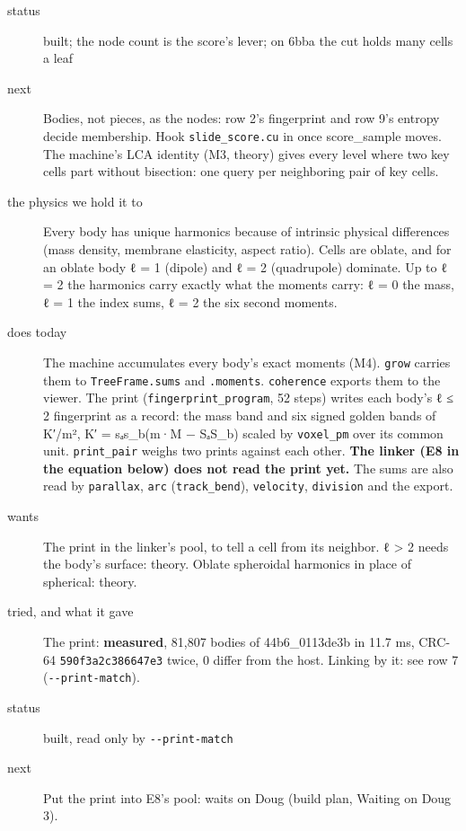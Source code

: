 \begin{description}
\item[{status}] built; the node count is the score's lever; on 6bba the cut holds many cells a leaf
\item[{next}] Bodies, not pieces, as the nodes: row 2's fingerprint and row 9's entropy decide membership. Hook \texttt{slide\_\allowbreak{}score.\allowbreak{}cu} in once score\_\allowbreak{}sample moves. The machine's LCA identity (M3, theory) gives every level where two key cells part without bisection: one query per neighboring pair of key cells.
\end{description}

\begin{description}
\item[{the physics we hold it to}] Every body has unique harmonics because of intrinsic physical differences (mass density, membrane elasticity, aspect ratio). Cells are oblate, and for an oblate body ℓ = 1 (dipole) and ℓ = 2 (quadrupole) dominate. Up to ℓ = 2 the harmonics carry exactly what the moments carry: ℓ = 0 the mass, ℓ = 1 the index sums, ℓ = 2 the six second moments.
\item[{does today}] The machine accumulates every body's exact moments (M4). \texttt{grow} carries them to \texttt{Tree\allowbreak{}Frame.\allowbreak{}sums} and \texttt{.\allowbreak{}moments}. \texttt{coherence} exports them to the viewer. The print (\texttt{fingerprint\_\allowbreak{}program}, 52 steps) writes each body's ℓ ≤ 2 fingerprint as a record: the mass band and six signed golden bands of K′/m², K′ = sₐs\_\allowbreak{}b(m·M − SₐS\_\allowbreak{}b) scaled by \texttt{voxel\_\allowbreak{}pm} over its common unit. \texttt{print\_\allowbreak{}pair} weighs two prints against each other. \textbf{The linker (E8 in the equation below) does not read the print yet.} The sums are also read by \texttt{parallax}, \texttt{arc} (\texttt{track\_\allowbreak{}bend}), \texttt{velocity}, \texttt{division} and the export.
\item[{wants}] The print in the linker's pool, to tell a cell from its neighbor. ℓ > 2 needs the body's surface: theory. Oblate spheroidal harmonics in place of spherical: theory.
\item[{tried, and what it gave}] The print: \textbf{measured}, 81,807 bodies of 44b6\_\allowbreak{}0113de3b in 11.7 ms, CRC-64 \texttt{590f3a2c386647e3} twice, 0 differ from the host. Linking by it: see row 7 (\texttt{-\allowbreak{}-\allowbreak{}print-\allowbreak{}match}).
\item[{status}] built, read only by \texttt{-\allowbreak{}-\allowbreak{}print-\allowbreak{}match}
\item[{next}] Put the print into E8's pool: waits on Doug (build plan, Waiting on Doug 3).
\end{description}

